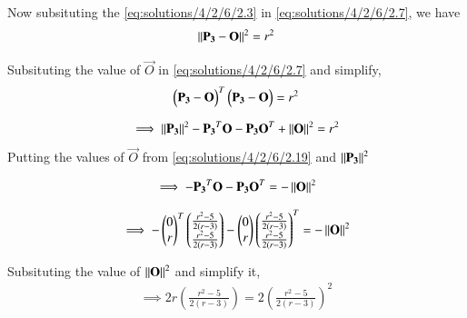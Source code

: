 Now subsituting the \ref{eq:solutions/4/2/6/2.3} in \ref{eq:solutions/4/2/6/2.7}, we have
\begin{align}
\left\lVert  \mathbf{ P_3} - \mathbf{O}\right\rVert^{2} = r^{2} \label{eq:solutions/4/2/6/2.20}
\end{align}

Subsituting the value of $\vec{O}$ in \ref{eq:solutions/4/2/6/2.7} and simplify,
\begin{align}
\begin{pmatrix}\mathbf{P_3} - \mathbf{O}\end{pmatrix}^T\begin{pmatrix}\mathbf{P_3} - \mathbf{O}\end{pmatrix} = r^2 \label{eq:solutions/4/2/6/2.21}
\end{align}


\begin{align}
 \implies \left\lVert\mathbf{P_3}\right\rVert^2 - \mathbf{P_3}^T\mathbf{O}  -  \mathbf{P_3} \mathbf{O}^T +\left\lVert\mathbf{O}\right\rVert^2 = r^2 \label{eq:solutions/4/2/6/2.22.1}
\end{align}
Putting the values  of $\vec{O}$ from \ref{eq:solutions/4/2/6/2.19} and $\left\lVert\mathbf{P_3}\right\rVert^2$

\begin{align}
\implies - \mathbf{P_3}^T\mathbf{O}  -  \mathbf{P_3} \mathbf{O}^T    = -  \left\lVert\mathbf{O}\right\rVert^2 \label{eq:solutions/4/2/6/2.22.22}
\end{align}



\begin{align}
\implies - \begin{pmatrix}0 \\ r\end{pmatrix}^T\begin{pmatrix} \frac{r^2 - 5}{2 \left(r - 3\right)} \\ \frac{r^2 - 5}{2 \left(r - 3\right)} \\\end{pmatrix}  -  \begin{pmatrix}0 \\ r\end{pmatrix} \begin{pmatrix} \frac{r^2 - 5}{2 \left(r - 3\right)} \\ \frac{r^2 - 5}{2 \left(r - 3\right)} \\\end{pmatrix}^T    = -  \left\lVert\mathbf{O}\right\rVert^2 \label{eq:solutions/4/2/6/2.22.2}
\end{align}

Subsituting the value of $\left\lVert\mathbf{O}\right\rVert^2$ and simplify it,
\begin{align}
\implies 2r \left( \frac{r^2 - 5}{2 \left(r - 3\right)} \right) = 2 \left( \frac{r^2 - 5}{2 \left(r - 3\right)} \right)^2 
\end{align}




